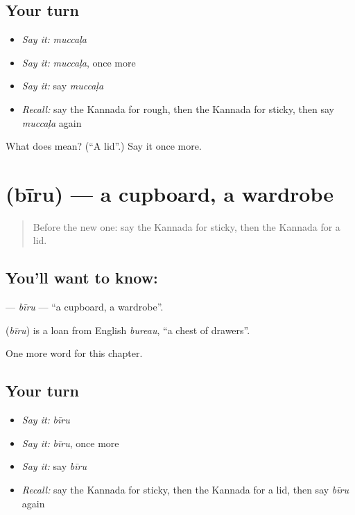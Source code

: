 \subsection*{Your turn}
\begin{itemize}
\raggedright
  \item \emph{Say it:} \emph{muccaḷa}
  \item \emph{Say it:} \emph{muccaḷa}, once more
  \item \emph{Say it:} say \emph{muccaḷa}
  \item \emph{Recall:} say the Kannada for rough, then the Kannada for sticky, then say \emph{muccaḷa} again
\end{itemize}

\begin{tcolorbox}[breakable,colback=teal!4,colframe=teal!35!black,title={Before you move on}]
What does  mean? (\textquotedblleft{}A lid\textquotedblright{}.) Say it once more.
\end{tcolorbox}
\section[\texorpdfstring{\kn{ಬೀರು} (bīru)}{ಬೀರು (bīru)}]{ (bīru) — a cupboard, a wardrobe}

\label{lesson:KA-C220-biru}



\begin{quote}
Before the new one: say the Kannada for sticky, then the Kannada for a lid.
\end{quote}

\subsection*{You'll want to know: }
\textbf{} — \emph{bīru} — \textquotedblleft{}a cupboard, a wardrobe\textquotedblright{}.

\begin{cousinweb}
\textbf{} (\emph{bīru}) is a loan from English \emph{bureau}, \textquotedblleft{}a chest of drawers\textquotedblright{}.
\end{cousinweb}

\begin{grammarlens}[title={What you've built}]
One more word for this chapter.
\end{grammarlens}

\subsection*{Your turn}
\begin{itemize}
\raggedright
  \item \emph{Say it:} \emph{bīru}
  \item \emph{Say it:} \emph{bīru}, once more
  \item \emph{Say it:} say \emph{bīru}
  \item \emph{Recall:} say the Kannada for sticky, then the Kannada for a lid, then say \emph{bīru} again
\end{itemize}

